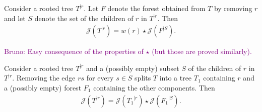 \documentclass[11 pt]{modarticle}
\newcommand{\wmap}{w}
\newcommand{\rtree}[2]{{#1}^{\lvert #2}}
\newcommand{\rindexsymbol}{\mathcal{J}}
\newcommand{\rindex}[2]{\rindexsymbol(\rtree{#2}{#1})}
\newcommand{\bldcomment}[1]{\textcolor{purple}{{\footnotesize Bruno:} #1}}
\begin{document}
\begin{lem}\label{lem:local-index-recursion}
	Consider a rooted tree $\rtree{T}{r}$. Let $F$ denote the forest obtained from $T$ by removing $r$ and let $S$ denote the set of the children of $r$ in $\rtree{T}{r}$. Then
\begin{eqnarray*}
	\rindex{r}{T} = \wmap(r) \star \rindex{S}{F}.
\end{eqnarray*}
\end{lem}
\bldcomment{Easy consequence of the properties of $\star$ (but those are proved similarly).}

\begin{cor}\label{cor:local-index-recursion}
	Consider a rooted tree $\rtree{T}{r}$ and a (possibly empty) subset $S$ of the children of $r$ in $\rtree{T}{r}$. Removing the edge $rs$ for every $s \in S$ splits $T$ into a tree $T_1$ containing $r$ and a (possibly empty) forest $F_1$ containing the other components. Then
\begin{eqnarray*}
	\rindex{r}{T} = \rindex{r}{T_1} \star \rindex{S}{F_1}.
\end{eqnarray*}
\end{cor}
\end{document}
